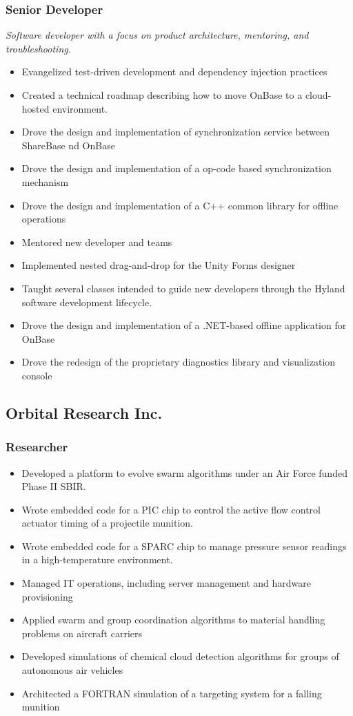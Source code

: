 \documentclass{cv_style}
\begin{document}
			\subsubsection*{Senior Developer}
			\textit{Software developer with a focus on product architecture, mentoring, and troubleshooting.}
			\begin{itemize}
				\item Evangelized test-driven development and dependency injection practices
				\item Created a technical roadmap describing how to move OnBase to a cloud-hosted environment.
				\item Drove the design and implementation of synchronization service between ShareBase nd OnBase
				\item Drove the design and implementation of a op-code based synchronization mechanism
				\item Drove the design and implementation of a C++ common library for offline operations
				\item Mentored new developer and teams
				\item Implemented nested drag-and-drop for the Unity Forms designer
				\item Taught several classes intended to guide new developers through the Hyland software development lifecycle.
				\item Drove the design and implementation of a .NET-based offline application for OnBase
				\item Drove the redesign of the proprietary diagnostics library and visualization console
			\end{itemize}

		\subsection{Orbital Research Inc.}
			\subsubsection*{Researcher}
			\begin{itemize}
				\item Developed a platform to evolve swarm algorithms under an Air Force funded Phase II SBIR.
				\item Wrote embedded code for a PIC chip to control the active flow control actuator timing of a projectile munition. 
				\item Wrote embedded code for a SPARC chip to manage pressure sensor readings in a high-temperature environment.
				\item Managed IT operations, including server management and hardware provisioning
				\item Applied swarm and group coordination algorithms to material handling problems on aircraft carriers
				\item Developed simulations of chemical cloud detection algorithms for groups of autonomous air vehicles
				\item Architected a FORTRAN simulation of a targeting system for a falling munition
			\end{itemize}
\end{document}
